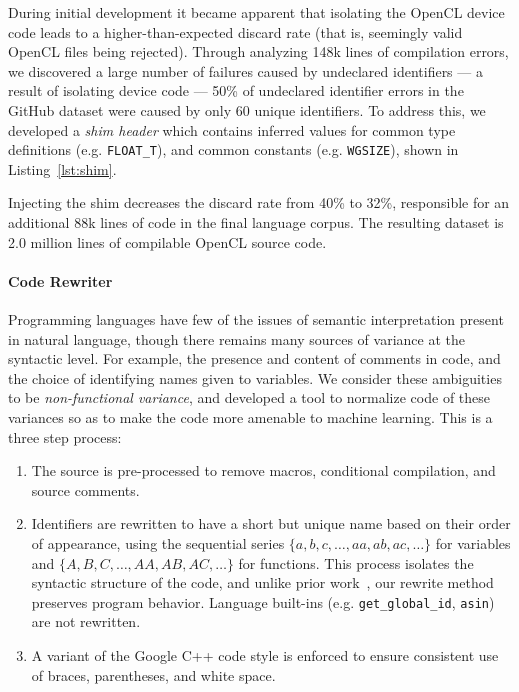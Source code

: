 During initial development it became apparent that isolating the OpenCL device code leads to a higher-than-expected discard rate (that is, seemingly valid OpenCL files being rejected). Through analyzing 148k lines of compilation errors, we discovered a large number of failures caused by undeclared identifiers --- a result of isolating device code --- 50\% of undeclared identifier errors in the GitHub dataset were caused by only 60 unique identifiers. To address this, we developed a \emph{shim header} which contains inferred values for common type definitions (e.g. \texttt{FLOAT\_T}), and common constants (e.g. \texttt{WGSIZE}), shown in Listing~\ref{lst:shim}.

Injecting the shim decreases the discard rate from 40\% to 32\%, responsible for an additional 88k lines of code in the final language corpus. The resulting dataset is 2.0 million lines of compilable OpenCL source code.

\paragraph{Code Rewriter} Programming languages have few of the issues of semantic interpretation present in natural language, though there remains many sources of variance at the syntactic level. For example, the presence and content of comments in code, and the choice of identifying names given to variables. We consider these  ambiguities to be \emph{non-functional variance}, and developed a tool to normalize code of these variances so as to make the code more amenable to machine learning. This is a three step process: %
%
\begin{enumerate}
  \item The source is pre-processed to remove macros, conditional compilation, and source comments. %
  \item Identifiers are rewritten to have a short but unique name based on their order of appearance, using the sequential series $\{a,\allowbreak b,\allowbreak c,\allowbreak \ldots,\allowbreak aa,\allowbreak ab,\allowbreak ac,\allowbreak \ldots\}$ for variables and $\{A,\allowbreak B,\allowbreak C,\allowbreak \ldots,\allowbreak AA,\allowbreak AB,\allowbreak AC,\allowbreak \ldots\}$ for functions. This process isolates the syntactic structure of the code, and unlike prior work~\cite{Allamanis2013a}, our rewrite method preserves program behavior. Language built-ins (e.g. \texttt{get\_global\_id}, \texttt{asin}) are not rewritten.%
  \item A variant of the Google C++ code style is enforced to ensure consistent use of braces, parentheses, and white space.
\end{enumerate}


